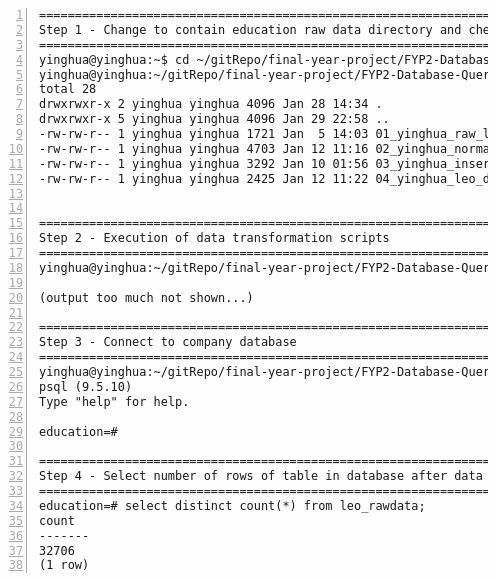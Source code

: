 \lstset{basicstyle=\ttfamily\tiny}  
\begin{lstlisting}[breaklines, frame=single, numbers=left, caption={Execution of PL/pgSQL's scripts for LEO data transformation.}, label=commandline-02]
========================================================================================
Step 1 - Change to contain education raw data directory and check the location of scripts
========================================================================================
yinghua@yinghua:~$ cd ~/gitRepo/final-year-project/FYP2-Database-Queries/education-database-queries
yinghua@yinghua:~/gitRepo/final-year-project/FYP2-Database-Queries/education-database-queries$ ls -al
total 28
drwxrwxr-x 2 yinghua yinghua 4096 Jan 28 14:34 .
drwxrwxr-x 5 yinghua yinghua 4096 Jan 29 22:58 ..
-rw-rw-r-- 1 yinghua yinghua 1721 Jan  5 14:03 01_yinghua_raw_leo_table_DDL.sql		<- This script 
-rw-rw-r-- 1 yinghua yinghua 4703 Jan 12 11:16 02_yinghua_normalized_leo_table_DDL.sql
-rw-rw-r-- 1 yinghua yinghua 3292 Jan 10 01:56 03_yinghua_insert_leo_table_DML.sql
-rw-rw-r-- 1 yinghua yinghua 2425 Jan 12 11:22 04_yinghua_leo_data_migration.sql


========================================================================================
Step 2 - Execution of data transformation scripts 
========================================================================================
yinghua@yinghua:~/gitRepo/final-year-project/FYP2-Database-Queries/education-database-queries$ psql -U yinghua -d education -a -f 01_yinghua_raw_leo_table_DDL.sql 

(output too much not shown...) 

========================================================================================
Step 3 - Connect to company database
========================================================================================
yinghua@yinghua:~/gitRepo/final-year-project/FYP2-Database-Queries/education-database-queries$ psql education; 
psql (9.5.10)
Type "help" for help.

education=# 

========================================================================================
Step 4 - Select number of rows of table in database after data transformation
========================================================================================
education=# select distinct count(*) from leo_rawdata; 
count 
-------
32706
(1 row)

\end{lstlisting}

